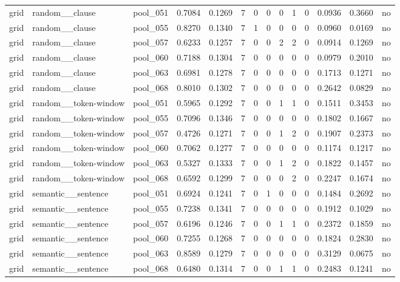 \begin{table}[t]
{\begin{tabular}{llllllllllllll}
grid & random\_\_clause & pool\_051 & 0.7084 & 0.1269 & 7 & 0 & 0 & 0 & 1 & 0 & 0.0936 & 0.3660 & no \\
grid & random\_\_clause & pool\_055 & 0.8270 & 0.1340 & 7 & 1 & 0 & 0 & 0 & 0 & 0.0960 & 0.0169 & no \\
grid & random\_\_clause & pool\_057 & 0.6233 & 0.1257 & 7 & 0 & 0 & 2 & 2 & 0 & 0.0914 & 0.1269 & no \\
grid & random\_\_clause & pool\_060 & 0.7188 & 0.1304 & 7 & 0 & 0 & 0 & 0 & 0 & 0.0979 & 0.2010 & no \\
grid & random\_\_clause & pool\_063 & 0.6981 & 0.1278 & 7 & 0 & 0 & 0 & 0 & 0 & 0.1713 & 0.1271 & no \\
grid & random\_\_clause & pool\_068 & 0.8010 & 0.1302 & 7 & 0 & 0 & 0 & 0 & 0 & 0.2642 & 0.0829 & no \\
grid & random\_\_token-window & pool\_051 & 0.5965 & 0.1292 & 7 & 0 & 0 & 1 & 1 & 0 & 0.1511 & 0.3453 & no \\
grid & random\_\_token-window & pool\_055 & 0.7096 & 0.1346 & 7 & 0 & 0 & 0 & 0 & 0 & 0.1802 & 0.1667 & no \\
grid & random\_\_token-window & pool\_057 & 0.4726 & 0.1271 & 7 & 0 & 0 & 1 & 2 & 0 & 0.1907 & 0.2373 & no \\
grid & random\_\_token-window & pool\_060 & 0.7062 & 0.1277 & 7 & 0 & 0 & 0 & 0 & 0 & 0.1174 & 0.1217 & no \\
grid & random\_\_token-window & pool\_063 & 0.5327 & 0.1333 & 7 & 0 & 0 & 1 & 2 & 0 & 0.1822 & 0.1457 & no \\
grid & random\_\_token-window & pool\_068 & 0.6592 & 0.1299 & 7 & 0 & 0 & 0 & 2 & 0 & 0.2247 & 0.1674 & no \\
grid & semantic\_\_sentence & pool\_051 & 0.6924 & 0.1241 & 7 & 0 & 1 & 0 & 0 & 0 & 0.1484 & 0.2692 & no \\
grid & semantic\_\_sentence & pool\_055 & 0.7238 & 0.1341 & 7 & 0 & 0 & 0 & 0 & 0 & 0.1912 & 0.1029 & no \\
grid & semantic\_\_sentence & pool\_057 & 0.6196 & 0.1246 & 7 & 0 & 0 & 1 & 1 & 0 & 0.2372 & 0.1859 & no \\
grid & semantic\_\_sentence & pool\_060 & 0.7255 & 0.1268 & 7 & 0 & 0 & 0 & 0 & 0 & 0.1824 & 0.2830 & no \\
grid & semantic\_\_sentence & pool\_063 & 0.8589 & 0.1279 & 7 & 0 & 0 & 0 & 0 & 0 & 0.3129 & 0.0675 & no \\
grid & semantic\_\_sentence & pool\_068 & 0.6480 & 0.1314 & 7 & 0 & 0 & 1 & 1 & 0 & 0.2483 & 0.1241 & no \\

\end{tabular}}
\end{table}
